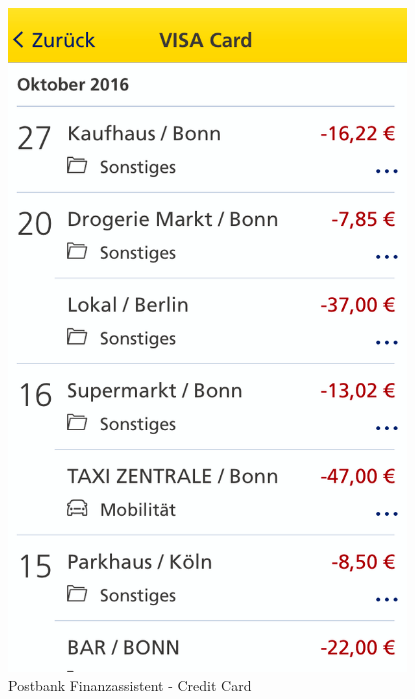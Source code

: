 \begin{figure}[H]
\begin{minipage}[b]{.5\linewidth}
        \centering\includegraphics[width=0.94\textwidth]{img/screenshots/ex3p8.png}
    \end{minipage}
	\captionsetup{labelformat=empty}
    \caption[]{Postbank Finanzassistent - Credit Card}
\end{figure}
